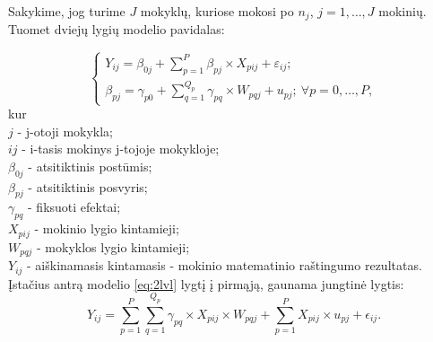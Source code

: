 \documentclass[12pt,a4paper]{article}
\begin{document}
\indent Sakykime, jog turime $J$ mokyklų, kuriose mokosi po $n_j$, $j = 1,\dots,J$ mokinių. Tuomet dviejų lygių modelio pavidalas:

\begin{equation} \label{eq:2lvl}
\left\{
\begin{array}{l}
Y_{ij} = \beta_{0j}+\sum^P_{p = 1} \beta_{pj}\times X_{pij}+\varepsilon_{ij}; \\
\beta_{pj} = \gamma_{p0} + \sum^{Q_p}_{q=1}\gamma_{pq}\times W_{pqj}+u_{pj};\ \forall p = 0 , \dots, P,
\end{array} \right.
\end{equation}
kur\\
$j$ - j-otoji mokykla;\\
$ij$ - i-tasis mokinys j-tojoje mokykloje;\\
$\beta_{0j}$ - atsitiktinis postūmis;\\
$\beta_{pj}$ - atsitiktinis posvyris;\\
$\gamma_{pq}$ - fiksuoti efektai;\\
$X_{pij}$ - mokinio lygio kintamieji;\\
$W_{pqj}$ - mokyklos lygio kintamieji;\\
$Y_{ij}$ - aiškinamasis kintamasis - mokinio matematinio raštingumo rezultatas.\\

\indent Įstačius antrą modelio \ref{eq:2lvl} lygtį į pirmąją, gaunama jungtinė lygtis:
\begin{equation} \label{eq:2lvljung}
Y_{ij} =\sum^P_{p = 1} \sum^{Q_p}_{q=1}\gamma_{pq}\times X_{pij}\times W_{pqj}+\sum^P_{p = 1} X_{pij}\times u_{pj}+\epsilon_{ij}.
\end{equation}
\end{document}
